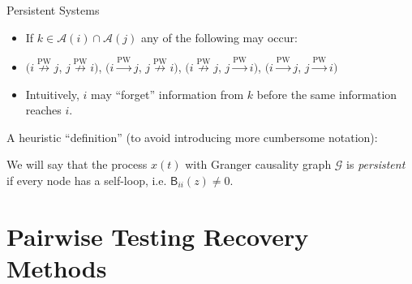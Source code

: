 \documentclass{beamer} %
\def\pwgc{\overset{\text{PW}}{\rightarrow}}  %
\def\npwgc{\overset{\text{PW}}{\nrightarrow}}  %
\def\gcg{\mathcal{G}}  %
\def\B{\mathsf{B}}  %
\newcommand{\anc}[1]{\mathcal{A}(#1)}  %
\begin{document}
\begin{frame}{Persistent Systems}
  \begin{itemize}
    \item{If $k \in \anc{i}\cap\anc{j}$ any of the following may occur:}\pause
    \item{
        $(i \npwgc j$, $j \npwgc i)$,
        $(i \pwgc j$, $j \npwgc i)$,
        $(i \npwgc j$, $j \pwgc i)$,
        $(i \pwgc j$, $j \pwgc i)$}\pause
    \item{Intuitively, $i$ may ``forget'' information from $k$ before the same information reaches $i$.}\pause
  \end{itemize}

  A heuristic ``definition'' (to avoid introducing more cumbersome notation):
  \begin{definition}[Persistent]
    We will say that the process $x(t)$ with Granger causality graph
    $\gcg$ is \textit{persistent} if every node has a self-loop,
    i.e. $\B_{ii}(z) \ne 0$.
  \end{definition}
    
\end{frame}

\section{Pairwise Testing Recovery Methods}
\begin{frame}
\end{frame}
\end{document}
